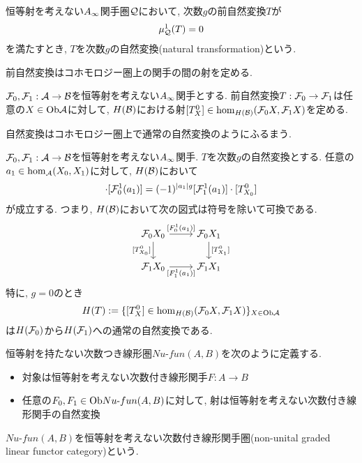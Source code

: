 \documentclass[uplatex, a4paper, 14Q, dvipdfmx]{jsarticle}
\begin{document}
\begin{definition}[自然変換]
  恒等射を考えない$A_{\infty}$関手圏$\mathcal{Q}$において, 次数$g$の前自然変換$T$が
  \begin{align*}
    \mu^1_{\mathcal{Q}}(T) = 0  
  \end{align*}
  を満たすとき, $T$を次数$g$の自然変換(natural transformation)という. 
\end{definition}

前自然変換はコホモロジー圏上の関手の間の射を定める. 

\begin{lemma}
  $\mathcal{F}_0,\mathcal{F}_1 : \mathcal{A} \to \mathcal{B}$を恒等射を考えない$A_{\infty}$関手とする. 
  前自然変換$T : \mathcal{F}_0 \to \mathcal{F}_1$は任意の$X \in \mathrm{Ob}\mathcal{A}$に対して, $H(\mathcal{B})$における射$[T^0_X] \in \hom_{H(\mathcal{B})}(\mathcal{F}_0X,\mathcal{F}_1X)$を定める. 
\end{lemma}

自然変換はコホモロジー圏上で通常の自然変換のようにふるまう. 

\begin{lemma} \label{prop_pre_natural_transformation_induces_natural_transformation}
  $\mathcal{F}_0,\mathcal{F}_1 : \mathcal{A} \to \mathcal{B}$を恒等射を考えない$A_{\infty}$関手. $T$を次数$g$の自然変換とする. 
  任意の$a_1 \in \hom_{\mathcal{A}}(X_0,X_1)$に対して, $H(\mathcal{B})$において
  \begin{align*}
    [T^0_{X_1}] \cdot [\F_0^1(a_1)]
    = (-1)^{|a_1|g} [\F_1^1(a_1)] \cdot [T^0_{X_0}]
  \end{align*}
  が成立する. 
  つまり, $H(\mathcal{B})$において次の図式は符号を除いて可換である. 
  \[\begin{tikzcd}
    {\F_0 X_0} & {\F_0 X_1} \\
    {\F_1 X_0} & {\F_1 X_1}
    \arrow["{[F^1_0(a_1)]}", from=1-1, to=1-2]
    \arrow["{[T^0_{X_1}]}", from=1-2, to=2-2]
    \arrow["{[T^0_{X_0}]}"', from=1-1, to=2-1]
    \arrow["{[F^1_1(a_1)]}"', from=2-1, to=2-2]
  \end{tikzcd}\]
  特に, $g=0$のとき
  \begin{align*}
    H(T) := \{[T^0_X] \in \hom_{H(\mathcal{B})}(\mathcal{F}_0 X,\mathcal{F}_1 X) \}_{X \in \mathrm{Ob}\mathcal{A}}
  \end{align*}
  は$H(\mathcal{F}_0)$から$H(\mathcal{F}_1)$への通常の自然変換である. 
\end{lemma}

\begin{definition}[恒等射を考えない次数付き線形関手圏]
  恒等射を持たない次数つき線形圏$Nu\text{-}fun(A,B)$を次のように定義する. 
  \begin{itemize}
    \item 対象は恒等射を考えない次数付き線形関手$F : A \to B$
    \item 任意の$F_0, F_1 \in \mathrm{Ob} Nu\text{-}fun(A,B)$に対して, 射は恒等射を考えない次数付き線形関手の自然変換
  \end{itemize}
  $Nu\text{-}fun(A,B)$を恒等射を考えない次数付き線形関手圏(non-unital graded linear functor category)という. 
\end{definition}
\end{document}
